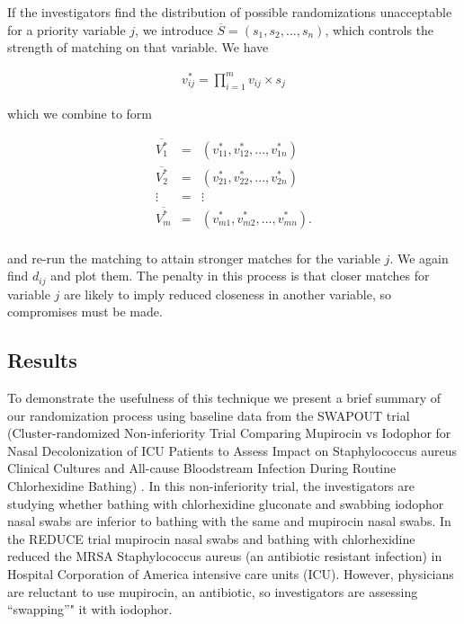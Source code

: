 \documentclass[]{sagej}
\begin{document}
If the investigators find the distribution of possible randomizations
unacceptable for a priority variable \(j\), we introduce
\(\overline{S} = (s_{1}, s_{2},..., s_{n})\), which controls the
strength of matching on that variable. We have

\begin{eqnarray*}
 v_{ij}^* = \prod_{i=1}^{m} v_{ij} \times s_j
\end{eqnarray*}

which we combine to form

\begin{eqnarray*}
 \overline{V_1^*} & = & (v_{11}^*, v_{12}^*,..., v_{1n}^*) \\
 \overline{V_2^*} & = & (v_{21}^*, v_{22}^*,..., v_{2n}^*) \\
 \vdots & = & \vdots\\    
 \overline{V_m^*} & = & (v_{m1}^*, v_{m2}^*,..., v_{mn}^*) .\\
\end{eqnarray*}

and re-run the matching to attain stronger matches for the variable
\(j\). We again find \(d_{ij}\) and plot them. The penalty in this
process is that closer matches for variable \(j\) are likely to imply
reduced closeness in another variable, so compromises must be made.

\subsection{Results}\label{results}

To demonstrate the usefulness of this technique we present a brief
summary of our randomization process using baseline data from the
SWAPOUT trial (Cluster-randomized Non-inferiority Trial Comparing
Mupirocin vs Iodophor for Nasal Decolonization of ICU Patients to Assess
Impact on Staphylococcus aureus Clinical Cultures and All-cause
Bloodstream Infection During Routine Chlorhexidine Bathing)
\citep{SOTrial}. In this non-inferiority trial, the investigators are
studying whether bathing with chlorhexidine gluconate and swabbing
iodophor nasal swabs are inferior to bathing with the same and mupirocin
nasal swabs. In the REDUCE trial \citep{huang2013targeted} mupirocin
nasal swabs and bathing with chlorhexidine reduced the MRSA
Staphylococcus aureus (an antibiotic resistant infection) in Hospital
Corporation of America intensive care units (ICU). However, physicians
are reluctant to use mupirocin, an antibiotic, so investigators are
assessing ``swapping''" it with iodophor.
\end{document}
